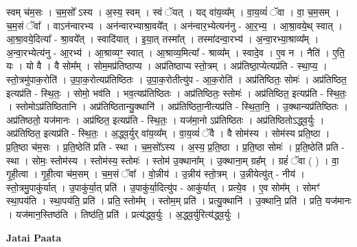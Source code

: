 \documentclass[17pt]{extarticle}
\begin{document}
स्वम् च॑म॒सः । च॒म॒सो᳚ ऽस्य । अ॒स्य॒ स्वम् । स्वं ॅयत् । यद् वा॑य॒व्य᳚म् । वा॒य॒व्यं॑ ॅवा । वा॒ च॒म॒सम् । च॒म॒सं ॅवा᳚ । वाऽन॑न्वारभ्य । अन॑न्वारभ्याश्रा॒वये᳚त् । अन॑न्वार॒भ्येत्यन॑नु - आ॒र॒भ्य॒ । आ॒श्रा॒वये॒थ् स्वात् । आ॒श्रा॒वये॒दित्या᳚ - श्रा॒वये᳚त् । स्वादि॑यात् । इ॒या॒त् तस्मा᳚त् । तस्मा॑दन्वा॒रभ्य॑ । अ॒न्वा॒रभ्या॒श्राव्य᳚म् । अ॒न्वा॒रभ्येत्य॑नु - आ॒रभ्य॑ । आ॒श्राव्यꣳ॒॒ स्वात् । आ॒श्राव्य॒मित्या᳚ - श्राव्य᳚म् । स्वादे॒व । ए॒व न । नैति॑ । ए॒ति॒ यः । यो वै । वै सोम᳚म् । सोम॒मप्र॑तिष्ठाप्य । अप्र॑तिष्ठाप्य स्तो॒त्रम् । अप्र॑तिष्ठा॒प्येत्यप्र॑ति - स्था॒प्य॒ । स्तो॒त्रमु॑पाक॒रोति॑ । उ॒पा॒क॒रोत्यप्र॑तिष्ठितः । उ॒पा॒क॒रोतीत्यु॑प - आ॒क॒रोति॑ । अप्र॑तिष्ठितः॒ सोमः॑ । अप्र॑तिष्ठित॒ इत्यप्र॑ति - स्थि॒तः॒ । सोमो॒ भव॑ति । भव॒त्यप्र॑तिष्ठितः । अप्र॑तिष्ठितः॒ स्तोमः॑ । अप्र॑तिष्ठित॒ इत्यप्र॑ति - स्थि॒तः॒ । स्तोमोऽप्र॑तिष्ठितानि । अप्र॑तिष्ठितान्यु॒क्थानि॑ । अप्र॑तिष्ठिता॒नीत्यप्र॑ति - स्थि॒ता॒नि॒ । उ॒क्थान्यप्र॑तिष्ठितः । अप्र॑तिष्ठतो॒ यज॑मानः । अप्र॑ष्ठित॒ इत्यप्र॑ति - स्थि॒तः॒ । यज॑मा॒नो ऽप्र॑तिष्ठितः । अप्र॑तिष्ठितोऽद्ध्व॒र्युः । अप्र॑तिष्ठित॒ इत्यप्र॑ति - स्थि॒तः॒ । अ॒द्ध्व॒र्युर् वा॑य॒व्य᳚म् । वा॒य॒व्यं॑ ॅवै । वै सोम॑स्य । सोम॑स्य प्रति॒ष्ठा । प्र॒ति॒ष्ठा च॑म॒सः । प्र॒ति॒ष्ठेति॑ प्रति - स्था । च॒म॒सो᳚ऽस्य । अ॒स्य॒ प्र॒ति॒ष्ठा । प्र॒ति॒ष्ठा सोमः॑ । प्र॒ति॒ष्ठेति॑ प्रति - स्था । सोमः॒ स्तोम॑स्य । स्तोम॑स्य॒ स्तोमः॑ । स्तोम॑ उ॒क्थाना᳚म् । उ॒क्थाना॒म् ग्रह᳚म् । ग्रहं॑ ॅवा ( ) । वा॒ गृ॒ही॒त्वा । गृ॒ही॒त्वा च॑म॒सम् । च॒म॒सं ॅवा᳚ । वो॒न्नीय॑ । उ॒न्नीय॑ स्तो॒त्रम् । उ॒न्नीयेत्यु॑त् - नीय॑ । स्तो॒त्रमु॒पाकु॑र्यात् । उ॒पाकु॑र्या॒त् प्रति॑ । उ॒पाकु॑र्या॒दित्यु॑प - आकु॑र्यात् । प्रत्ये॒व । ए॒व सोम᳚म् । सोमꣳ॑ स्था॒पय॑ति । स्था॒पय॑ति॒ प्रति॑ । प्रति॒ स्तोम᳚म् । स्तोम॒म् प्रति॑ । प्रत्यु॒क्थानि॑ । उ॒क्थानि॒ प्रति॑ । प्रति॒ यज॑मानः । यज॑मान॒स्तिष्ठ॑ति । तिष्ठ॑ति॒ प्रति॑ । प्रत्य॑द्ध्व॒र्युः । अ॒द्ध्व॒र्युरित्य॑द्ध्व॒र्युः । \newline

\textbf{Jatai Paata} \newline
\end{document}
